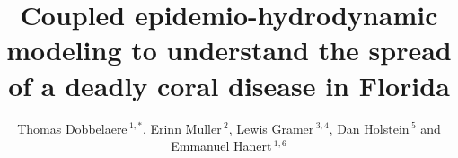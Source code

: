 \documentclass[utf8]{frontiersSCNS}
\def\firstAuthorLast{Dobbelaere {et~al.}} %
\def\Authors{Thomas Dobbelaere\,$^{1,*}$, Erinn Muller\,$^{2}$, Lewis Gramer\,$^{3,4}$, Dan Holstein\,$^{5}$  and Emmanuel Hanert\,$^{1,6}$}
\begin{document}
\onecolumn
{}

\title[Modeling the spread of SCTLD in Florida]{Coupled epidemio-hydrodynamic modeling to understand the spread of a deadly coral disease in Florida}

\author[\firstAuthorLast ]{\Authors} %
\address{} %
\correspondance{} %
\extraAuth{}

\maketitle
\end{document}
